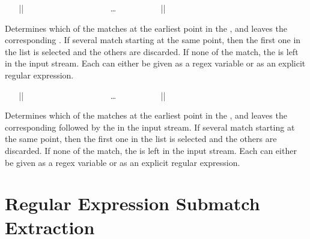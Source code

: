 \documentclass[oneside]{book}
\begin{document}
\begin{function}{\regexMatchCaseF}
\begin{syntax}
~ ~ |{|
~ ~ ~ ~  
~ ~ ~ ~  
~ ~ ~ ~ \ldots
~ ~ ~ ~  
~ ~ |}| 
~ ~ 
\end{syntax}
Determines which of the  matches at the
earliest point in the , and leaves the
corresponding .
If several  match starting at the same
point, then the first one in the list is selected and the others are
discarded.  If none of the  match, the 
is left in the input stream.  Each  can either be given
as a regex variable or as an explicit regular expression.
\end{function}

\begin{function}{\regexMatchCaseTF}
\begin{syntax}
~ ~ |{|
~ ~ ~ ~  
~ ~ ~ ~  
~ ~ ~ ~ \ldots
~ ~ ~ ~  
~ ~ |}| 
~ ~  
\end{syntax}
Determines which of the  matches at the
earliest point in the , and leaves the
corresponding  followed by the  in the
input stream.  If several  match starting at the same
point, then the first one in the list is selected and the others are
discarded.  If none of the  match, the 
is left in the input stream.  Each  can either be given
as a regex variable or as an explicit regular expression.
\end{function}

\section{Regular Expression Submatch Extraction}
\end{document}
